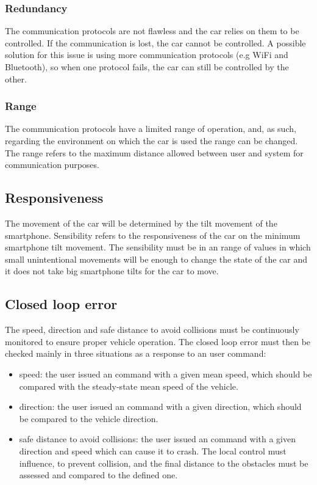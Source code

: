 \subsubsection{Redundancy}
\label{sec:orgc5933fc}
The communication protocols are not flawless and the car relies on them to be controlled. If the communication is lost, the car cannot be controlled. A possible solution for this issue is using more communication protocols (e.g WiFi and Bluetooth), so when one protocol fails, the car can still be controlled by the other.
\subsubsection{Range}%
\label{sec:org447a205}
The communication protocols have a limited range of operation, and, as such, regarding the environment on which the car is used the range can be changed.
The range refers to the maximum distance allowed between user and system for communication purposes.
\subsection{Responsiveness}%
\label{sec:org622e63a}
The movement of the car will be determined by the tilt movement of the smartphone. Sensibility refers to the responsiveness of the car on the minimum smartphone tilt movement. The sensibility must be in an range of values in which small unintentional movements will be enough to change the state of the car and it does not take big smartphone tilts for the car to move.
\subsection{Closed loop error}%
\label{sec:closed-loop-error-specs}
The speed, direction and safe distance to avoid collisions must be continuously monitored to ensure proper vehicle operation. The closed loop error must then be checked mainly in three situations as a response to an user command:
\begin{itemize}
\item speed: the user issued an command with a given mean speed, which should be compared with the steady-state mean speed of the vehicle.
\item direction: the user issued an command with a given direction, which should be compared to the vehicle direction.
\item safe distance to avoid collisions: the user issued an command with a given direction and speed which can cause it to crash. The local control must influence, to prevent collision, and the final distance to the obstacles must be assessed and compared to the defined one.
\end{itemize}
